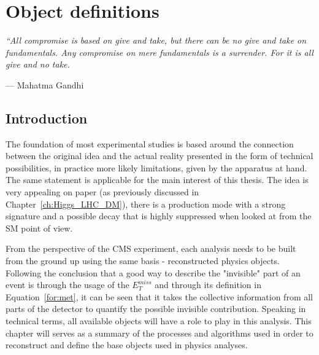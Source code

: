 
\chapter{Object definitions}
\label{ch:objects}
\epigraph{\itshape``All compromise is based on give and take, but there can be no give and take on fundamentals. Any compromise on mere fundamentals is a surrender. For it is all give and no take. }{--- \textup{Mahatma Gandhi}}

\normallinespacing
\mediumlinespacing

\section{Introduction}


\hspace{10pt} The foundation of most experimental studies is based around the connection between the original idea and the actual reality presented in the form of technical possibilities, in practice more likely limitations, given by the apparatus at hand. The same statement is applicable for the main interest of this thesis. The idea is very appealing on paper (as previously discussed in Chapter~\ref{ch:Higgs_LHC_DM}), there is a production mode with a strong signature and a possible decay that is highly suppressed when looked at from the SM point of view.

\hspace{10pt} From the perspective of the CMS experiment, each analysis needs to be built from the ground up using the same basis - reconstructed physics objects. Following the conclusion that a good way to describe the "invisible" part of an event is through the usage of the $E_{T}^{miss}$ and through its definition in Equation~\ref{for:met}, it can be seen that it takes the collective information from all parts of the detector to quantify the possible invisible contribution. Speaking in technical terms, all available objects will have a role to play in this analysis. This chapter will serves as a summary of the processes and algorithms used in order to reconstruct and define the base objects used in physics analyses.%

